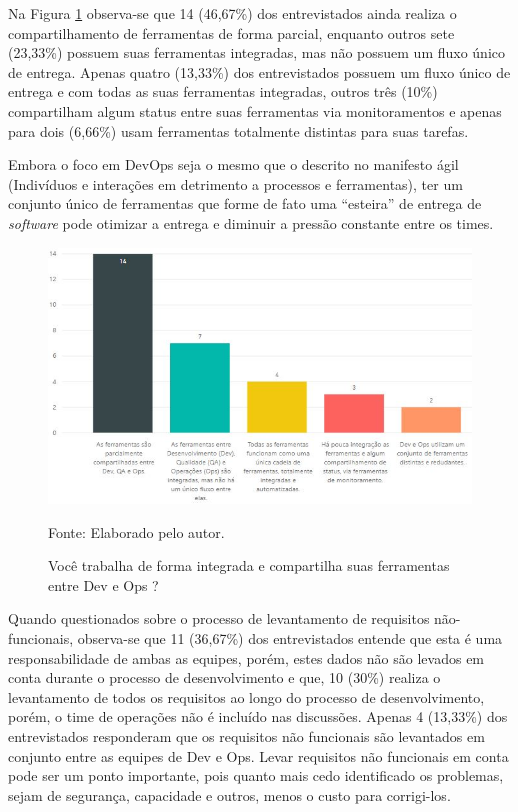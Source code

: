 \documentclass[twoside,english,brazilian]{UNISINOSartigo}
\newcommand{\source}[1]{\caption*{Fonte: {#1}} }
\begin{document}
%
Na Figura \ref{fig:compartFerramentas} observa-se que 14 (46,67\%) dos entrevistados ainda realiza o compartilhamento de ferramentas de forma parcial, enquanto outros sete (23,33\%) possuem suas ferramentas integradas, mas não possuem um fluxo único de entrega. Apenas quatro (13,33\%) dos entrevistados possuem um fluxo único de entrega e com todas as suas ferramentas integradas, outros três (10\%) compartilham algum status entre suas ferramentas via monitoramentos e apenas para dois (6,66\%) usam ferramentas totalmente distintas para suas tarefas.

Embora o foco em DevOps seja o mesmo que o descrito no manifesto ágil (Indivíduos e interações em detrimento a processos e ferramentas), ter um conjunto único de ferramentas que forme de fato uma ``esteira'' de entrega de \textit{software} pode otimizar a entrega e diminuir a pressão constante entre os times.

\begin{figure}[H]
    \centering
    \caption{Você trabalha de forma integrada e compartilha suas ferramentas entre Dev e Ops ?}
       \includegraphics[scale=.6]{imagens/compartilhamentoFerramentas.JPG}
        \source{Elaborado pelo autor.}
    \label{fig:compartFerramentas}
\end{figure}

Quando questionados sobre o processo de levantamento de requisitos não-funcionais, observa-se que 11 (36,67\%) dos entrevistados entende que esta é uma responsabilidade de ambas as equipes, porém, estes dados não são levados em conta durante o processo de desenvolvimento e que, 10 (30\%) realiza o levantamento de todos os requisitos ao longo do processo de desenvolvimento, porém, o time de operações não é incluído nas discussões. Apenas 4 (13,33\%) dos entrevistados responderam que os requisitos não funcionais são levantados em conjunto entre as equipes de Dev e Ops.
Levar requisitos não funcionais em conta pode ser um ponto importante, pois quanto mais cedo identificado os problemas, sejam de segurança, capacidade e outros, menos o custo para corrigi-los.
\end{document}
